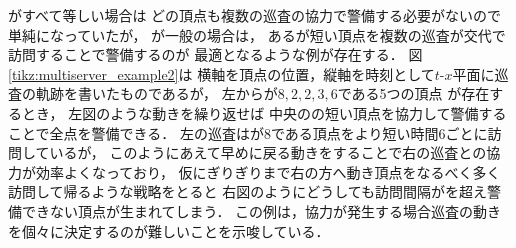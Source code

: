 {\timelimit}がすべて等しい場合は
どの頂点も複数の巡査の協力で警備する必要がないので単純になっていたが，
%
{\timelimit}が一般の場合は，
ある{\timelimit}が短い頂点を複数の巡査が交代で訪問することで警備するのが
最適となるような例が存在する．
%
図\ref{tikz:multiserver_example2}は
横軸を頂点の位置，縦軸を時刻として$t$-$x$平面に巡査の軌跡を書いたものであるが，
%
左から{\timelimit}が$8,2,2,3,6$である5つの頂点
が存在するとき，
左図のような動きを繰り返せば
中央の{\timelimit}の短い頂点を協力して警備することで全点を警備できる．
左の巡査は{\timelimit}が$8$である頂点をより短い時間$6$ごとに訪問しているが，
このようにあえて早めに戻る動きをすることで右の巡査との協力が効率よくなっており，
仮に{\timelimit}ぎりぎりまで右の方へ動き頂点をなるべく多く訪問して帰るような戦略をとると
右図のようにどうしても訪問間隔が{\timelimit}を超え警備できない頂点が生まれてしまう．
%
この例は，協力が発生する場合巡査の動きを個々に決定するのが難しいことを示唆している．
%

